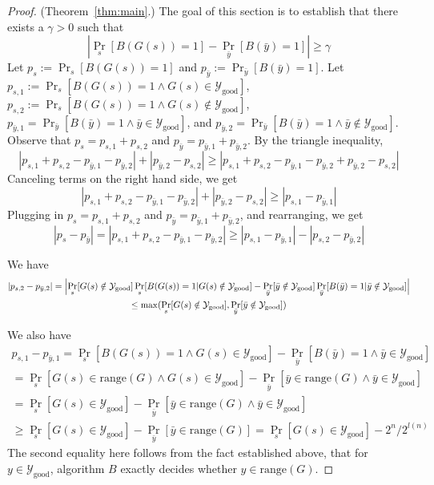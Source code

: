 \documentclass{article}
\def \Ygood{\mathcal{Y}_\text{good}}
\def \by{{\bar{y}}}
\theoremstyle{definition}
\theoremstyle{remark}
\begin{document}
\begin{proof}{(Theorem~\ref{thm:main}.)}
The goal of this section is to establish that there exists a $\gamma > 0$ such that
$$
|
\Pr_s[B(G(s)) = 1] - \Pr_{\bar{y}}[B(\bar{y}) = 1]
| \geq \gamma
$$
Let $p_s := \Pr_s[B(G(s)) = 1]$ and $p_\by := \Pr_{\bar{y}}[B(\bar{y}) = 1]$.
Let $p_{s, 1} := \Pr_s[B(G(s)) = 1 \wedge G(s) \in \Ygood]$,
$p_{s, 2} := \Pr_s[B(G(s)) = 1 \wedge G(s) \notin \Ygood]$,
$p_{\by, 1} = \Pr_{\bar{y}}[B(\bar{y}) = 1 \wedge \by \in \Ygood]$,
and
$p_{\by, 2} = \Pr_{\bar{y}}[B(\bar{y}) = 1 \wedge \by \notin \Ygood]$.
Observe that
$p_s = p_{s, 1} + p_{s, 2}$ and $p_\by = p_{\by, 1} + p_{\by, 2}$.
By the triangle inequality,
$$
|p_{s, 1} + p_{s, 2} - p_{\by, 1} - p_{\by, 2}| + |p_{\by, 2} - p_{s, 2}| \geq |p_{s, 1} + p_{s, 2} - p_{\by, 1} - p_{\by, 2} + p_{\by, 2} - p_{s, 2}|
$$
Canceling terms on the right hand side, we get
$$
|p_{s, 1} + p_{s, 2} - p_{\by, 1} - p_{\by, 2}| + |p_{\by, 2} - p_{s, 2}| \geq |p_{s, 1} - p_{\by, 1}|
$$
Plugging in $p_s = p_{s, 1} + p_{s, 2}$ and $p_\by = p_{\by, 1} + p_{\by, 2}$, and rearranging, we get
\begin{equation} \label{eq:triangle_inequality_application}
|p_s - p_\by| = |p_{s, 1} + p_{s, 2} - p_{\by, 1} - p_{\by, 2}| \geq |p_{s, 1} - p_{\by, 1}| - |p_{s, 2} - p_{\by, 2}|
\end{equation}

We have
\begin{multline} \label{eq:terms_ybad}
|p_{s, 2} - p_{\by, 2}| = 
\Bigl | \Pr_{s}[G(s) \notin \Ygood] \Pr_s[B(G(s)) = 1 | G(s) \notin \Ygood]
 - \Pr_\by[\by \notin \Ygood] \Pr_\by[B(\by) = 1 | \by \notin \Ygood] \Bigr |
\\
\leq \max(\Pr_s[G(s) \notin \Ygood], \Pr_\by[\by \notin \Ygood])
\end{multline}

We also have
\begin{multline} \label{eq:terms_ygood}
p_{s, 1} - p_{\by, 1} =
\Pr_s[B(G(s)) = 1 \wedge G(s) \in \Ygood] - \Pr_\by[B(\by) = 1 \wedge \by \in \Ygood]
 \\
= 
\Pr_s[G(s) \in \text{range}(G) \wedge G(s) \in \Ygood] -
\Pr_\by[\by \in \text{range}(G) \wedge \by \in \Ygood]
\\
= \Pr_s[G(s) \in \Ygood] - \Pr_\by[\by \in \text{range}(G) \wedge \by \in \Ygood] \\
\geq \Pr_s[G(s) \in \Ygood] - \Pr_\by[\by \in \text{range}(G)] 
= \Pr_s[G(s) \in \Ygood] - 2^n/2^{l(n)}
\end{multline}
The second equality here follows from the fact established above, that for $y \in \Ygood$, algorithm $B$ exactly decides whether $y \in \text{range}(G)$.


\end{proof}
\end{document}
